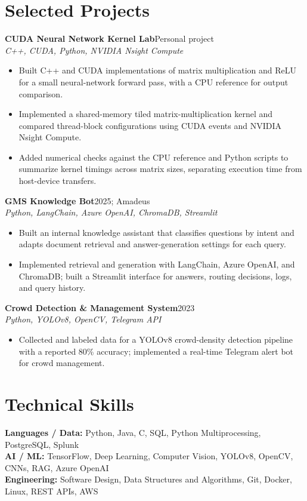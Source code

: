 \documentclass[a4paper,10pt]{article}
\newcommand{\project}[3]{\textbf{#1}\hfill #2\\\textit{#3}\par}
\begin{document}
\section{Selected Projects}
\project{CUDA Neural Network Kernel Lab}{Personal project}{C++, CUDA, Python, NVIDIA Nsight Compute}
\begin{itemize}
\item Built C++ and CUDA implementations of matrix multiplication and ReLU for a small neural-network forward pass, with a CPU reference for output comparison.
\item Implemented a shared-memory tiled matrix-multiplication kernel and compared thread-block configurations using CUDA events and NVIDIA Nsight Compute.
\item Added numerical checks against the CPU reference and Python scripts to summarize kernel timings across matrix sizes, separating execution time from host-device transfers.
\end{itemize}
\project{GMS Knowledge Bot}{2025; Amadeus}{Python, LangChain, Azure OpenAI, ChromaDB, Streamlit}
\begin{itemize}
\item Built an internal knowledge assistant that classifies questions by intent and adapts document retrieval and answer-generation settings for each query.
\item Implemented retrieval and generation with LangChain, Azure OpenAI, and ChromaDB; built a Streamlit interface for answers, routing decisions, logs, and query history.
\end{itemize}
\project{Crowd Detection \& Management System}{2023}{Python, YOLOv8, OpenCV, Telegram API}
\begin{itemize}
\item Collected and labeled data for a YOLOv8 crowd-density detection pipeline with a reported 80\% accuracy; implemented a real-time Telegram alert bot for crowd management.
\end{itemize}

\section{Technical Skills}
\textbf{Languages / Data:} Python, Java, C, SQL, Python Multiprocessing, PostgreSQL, Splunk\\
\textbf{AI / ML:} TensorFlow, Deep Learning, Computer Vision, YOLOv8, OpenCV, CNNs, RAG, Azure OpenAI\\
\textbf{Engineering:} Software Design, Data Structures and Algorithms, Git, Docker, Linux, REST APIs, AWS
\end{document}
